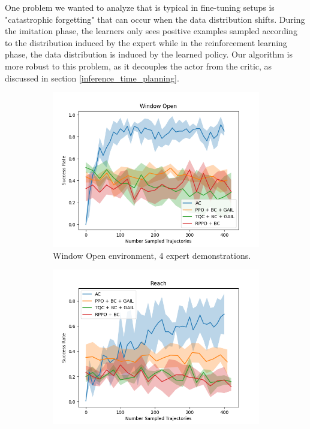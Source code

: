 One problem we wanted to analyze that is typical in fine-tuning setups 
is "catastrophic forgetting" 
that can occur when the data distribution shifts. During the imitation phase, the learners only sees positive examples sampled according to 
the distribution induced by the expert while in the reinforcement learning phase, the data distribution is induced by the learned policy.
Our algorithm is more robust to this problem, as it 
decouples the actor from the critic, as discussed in section \ref{inference_time_planning}.\\ 

\begin{figure}[htbp]
  \centering
  \begin{subfigure}[t]{0.45\textwidth}
    \includegraphics[width=\textwidth]{images/FineTuning/Window Open.png}
    \caption{Window Open environment, 4 expert demonstrations.}
    \label{fig:plot3}
  \end{subfigure}
  \begin{subfigure}[t]{0.45\textwidth}
    \includegraphics[width=\textwidth]{images/FineTuning/Reach.png}

\end{subfigure}
\end{figure}
